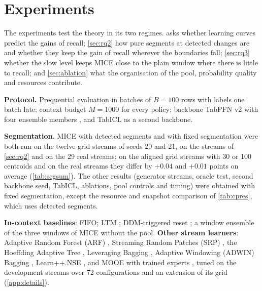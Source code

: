 \documentclass[11pt]{article}
\theoremstyle{plain}
\theoremstyle{definition}
\theoremstyle{remark}
\newcommand{\method}{\textsc{MICE}}   %
\begin{document}
\section{Experiments}
\label{sec:exp}

The experiments test the theory in its two regimes.  asks whether learning curves predict the
gains of recall; \cref{sec:rq2} how pure segments at detected changes are and whether they keep the gain of recall
wherever the boundaries fall; \cref{sec:rq3} whether
the slow level keeps \method{} close to the plain window where there is little to recall; and \cref{sec:ablation}
what the organisation of the pool, probability quality and resources contribute.

\textbf{Protocol.} Prequential evaluation in batches of $B=100$ rows with labels one batch late; context budget
$M=1000$ for every policy; backbone TabPFN v2 with four ensemble members \citep{hollmann2025tabpfn}, and TabICL
\citep{qu2025tabicl} as a second backbone.

\textbf{Segmentation.} \method{} with detected segments and with fixed segmentation were both run on the twelve grid
streams of seeds 20 and 21, on the streams of \cref{sec:rq2} and on the 29 real streams; on the aligned grid streams
with 30 or 100 centroids and on the real streams they differ by $+0.04$ and $+0.01$ points on average
(\cref{tab:segsum}). The other results (generator streams, oracle test, second backbone seed, TabICL, ablations, pool
controls and timing) were obtained with fixed segmentation, except the resource and snapshot comparison of
\cref{tab:cpres}, which uses detected segments.

\textbf{In-context baselines}: FIFO; LTM \citep{lourenco2026streams}; DDM-triggered reset \citep{gama2004ddm}; a window ensemble of the three windows of
\method{} without the pool. \textbf{Other stream learners}: Adaptive Random Forest (ARF) \citep{gomes2017arf}, Streaming
Random Patches (SRP) \citep{gomes2019srp}, the Hoeffding Adaptive Tree \citep{bifet2009hat}, Leveraging Bagging
\citep{bifet2010levbag}, Adaptive Windowing (ADWIN) Bagging \citep{bifet2009new}, Learn++.NSE \citep{elwell2011nse}, and MOOE with trained experts
\citep{zhao2025mooe}, tuned on the development streams over 72 configurations and an extension of its grid
(\cref{app:details}).
\end{document}
